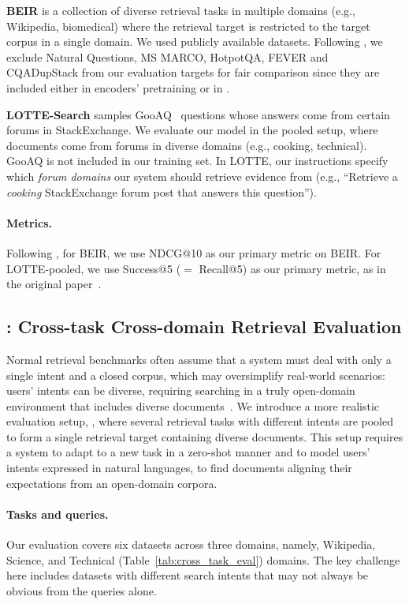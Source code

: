 {\bf BEIR} is a collection of diverse retrieval tasks in multiple domains (e.g., Wikipedia, biomedical) where the retrieval target is restricted to the target corpus in a single domain. We used publicly available datasets. Following \citet{promptagator}, we exclude Natural Questions, MS MARCO, HotpotQA, FEVER and CQADupStack from our evaluation targets for fair comparison since they are included either in encoders' pretraining or in \rib. 

{\bf LOTTE-Search} samples GooAQ~\cite{khashabi-etal-2021-gooaq-open} questions whose answers come from certain forums in StackExchange. 
We evaluate our model in the pooled setup, where documents come from forums in diverse domains (e.g., cooking, technical). GooAQ is not included in our training set. 
In LOTTE, our instructions specify which {\it forum domains} our system should retrieve evidence from (e.g., ``Retrieve a {\it cooking} StackExchange forum post that answers this question''). 

\paragraph{Metrics.}
Following \citet{thakur2021beir}, for BEIR, we use NDCG@10 as our primary metric on BEIR. For LOTTE-pooled, we use Success@5 ($=$ Recall@5) as our primary metric, as in the original paper~\cite{santhanam-etal-2022-colbertv2}.

\subsection{\task: Cross-task Cross-domain Retrieval Evaluation} 
\label{sec:evaluatiom_benchmark}
{
{
Normal retrieval benchmarks often assume that a system must deal with only a single intent and a closed corpus, which may oversimplify real-world scenarios: users' intents can be diverse, requiring searching in a truly open-domain environment that includes diverse documents~\cite{piktus2021web}. 
}
We introduce a more realistic evaluation setup, \task, where several retrieval tasks with different intents are pooled to form a single retrieval target containing diverse documents. This setup requires a system to adapt to a new task in a zero-shot manner and to model users' intents expressed in natural languages, to find documents aligning their expectations from an open-domain corpora. 
}

\paragraph{Tasks and queries.}
Our \task evaluation covers six datasets across three domains, namely, Wikipedia, Science, and Technical (Table~\ref{tab:cross_task_eval}) domains. 
The key challenge here includes datasets with different search intents that may not always be obvious from the queries alone. 

